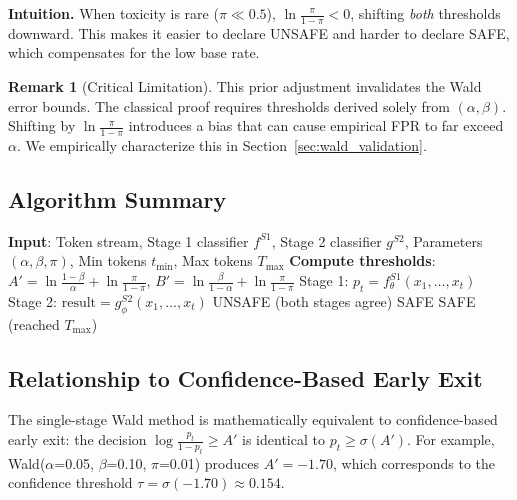 \documentclass[acmtjournal, acmnowidth]{acmart}
\theoremstyle{definition}
\newtheorem{remark}{Remark}[section]
\begin{document}
\textbf{Intuition.} When toxicity is rare ($\pi \ll 0.5$), $\ln\frac{\pi}{1-\pi} < 0$, shifting \textit{both} thresholds downward. This makes it easier to declare UNSAFE and harder to declare SAFE, which compensates for the low base rate.

\begin{remark}[Critical Limitation]
This prior adjustment invalidates the Wald error bounds. The classical proof requires thresholds derived solely from $(\alpha, \beta)$. Shifting by $\ln\frac{\pi}{1-\pi}$ introduces a bias that can cause empirical FPR to far exceed $\alpha$. We empirically characterize this in Section~\ref{sec:wald_validation}.
\end{remark}

\subsection{Algorithm Summary}

\begin{algorithm}[t]
\caption{Cascade-Guard: Two-Stage Streaming Safety Detection}
\label{alg:cascade}
\begin{algorithmic}[1]
\STATE \textbf{Input}: Token stream, Stage 1 classifier $f^{S1}$, Stage 2 classifier $g^{S2}$, Parameters $(\alpha, \beta, \pi)$, Min tokens $t_{\min}$, Max tokens $T_{\max}$
\STATE \textbf{Compute thresholds}: $A' = \ln\frac{1-\beta}{\alpha} + \ln\frac{\pi}{1-\pi}$, $B' = \ln\frac{\beta}{1-\alpha} + \ln\frac{\pi}{1-\pi}$
    \STATE Stage 1: $p_t = f^{S1}_\theta(x_1, \ldots, x_t)$
        \STATE Stage 2: $\text{result} = g^{S2}_\phi(x_1, \ldots, x_t)$
         \RETURN UNSAFE (both stages agree)
        \ENDIF
    \ENDIF
     \RETURN SAFE
    \ENDIF
\ENDFOR
\STATE \RETURN SAFE (reached $T_{\max}$)
\end{algorithmic}
\end{algorithm}

\subsection{Relationship to Confidence-Based Early Exit}
\label{sec:threshold_advantages}

The single-stage Wald method is mathematically equivalent to confidence-based early exit: the decision $\log\frac{p_t}{1-p_t} \geq A'$ is identical to $p_t \geq \sigma(A')$. For example, Wald($\alpha$=0.05, $\beta$=0.10, $\pi$=0.01) produces $A'=-1.70$, which corresponds to the confidence threshold $\tau = \sigma(-1.70) \approx 0.154$.
\end{document}
